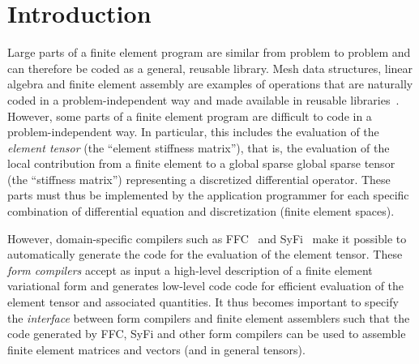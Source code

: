 \chapter{Introduction}

\label{sec:interfaces}

\begin{figure}
\end{figure}

Large parts of a finite element program are similar from problem to
problem and can therefore be coded as a general, reusable library.
Mesh data structures, linear algebra and finite element assembly are
examples of operations that are naturally coded in a
problem-independent way and made available in reusable
libraries~\cite{logg:www:03,Sundance,dealII,FEMLAB,Cactus,UG,Kaskade,Overture,PETSc,Trilinos,www:Diffpack}.
However, some parts of a finite element program are difficult to code
in a problem-independent way. In particular, this includes the
evaluation of the \emph{element tensor} (the ``element stiffness
matrix''), that is, the evaluation of the local contribution from a
finite element to a global sparse global sparse tensor (the
``stiffness matrix'') representing a discretized differential
operator. These parts must thus be implemented by the application
programmer for each specific combination of differential equation and
discretization (finite element spaces).

However, domain-specific compilers such as FFC~\cite{www:ffc,other}
and SyFi~\cite{www:syfi,other} make it possible to automatically
generate the code for the evaluation of the element tensor. These
\emph{form compilers} accept as input a high-level description of a
finite element variational form and generates low-level code code for
efficient evaluation of the element tensor and associated quantities.
It thus becomes important to specify the \emph{interface} between form
compilers and finite element assemblers such that the code generated
by FFC, SyFi and other form compilers can be used to assemble finite
element matrices and vectors (and in general tensors).

